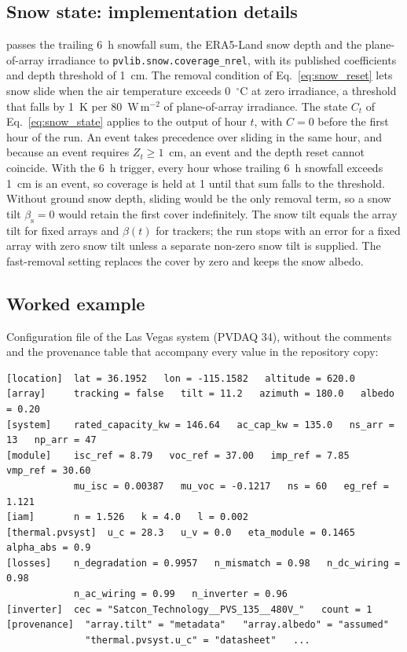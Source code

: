 \documentclass[11pt]{article}
\begin{document}
\subsection{Snow state: implementation details}
\label{sec:s_snow}

\RePV{} passes the trailing 6~h snowfall sum, the ERA5-Land snow depth and the plane-of-array irradiance to \texttt{pvlib.snow.coverage\_nrel}, with its published coefficients and depth threshold of 1~cm. The removal condition of Eq.~\ref{eq:snow_reset} lets snow slide when the air temperature exceeds 0~$^{\circ}$C at zero irradiance, a threshold that falls by 1~K per 80~W\,m$^{-2}$ of plane-of-array irradiance. The state $C_t$ of Eq.~\ref{eq:snow_state} applies to the output of hour $t$, with $C=0$ before the first hour of the run. An event takes precedence over sliding in the same hour, and because an event requires $Z_t\geq1$~cm, an event and the depth reset cannot coincide. With the 6~h trigger, every hour whose trailing 6~h snowfall exceeds 1~cm is an event, so coverage is held at 1 until that sum falls to the threshold. Without ground snow depth, sliding would be the only removal term, so a snow tilt $\beta_{\mathrm{s}}=0$ would retain the first cover indefinitely. The snow tilt equals the array tilt for fixed arrays and $\beta(t)$ for trackers; the run stops with an error for a fixed array with zero snow tilt unless a separate non-zero snow tilt is supplied. The fast-removal setting replaces the cover by zero and keeps the snow albedo.

\subsection{Worked example}
\label{sec:s_example}

Configuration file of the Las Vegas system (PVDAQ 34), without the comments and the provenance table that accompany every value in the repository copy:
{\scriptsize
\begin{verbatim}
[location]  lat = 36.1952   lon = -115.1582   altitude = 620.0
[array]     tracking = false   tilt = 11.2   azimuth = 180.0   albedo = 0.20
[system]    rated_capacity_kw = 146.64   ac_cap_kw = 135.0   ns_arr = 13   np_arr = 47
[module]    isc_ref = 8.79   voc_ref = 37.00   imp_ref = 7.85   vmp_ref = 30.60
            mu_isc = 0.00387   mu_voc = -0.1217   ns = 60   eg_ref = 1.121
[iam]       n = 1.526   k = 4.0   l = 0.002
[thermal.pvsyst]  u_c = 28.3   u_v = 0.0   eta_module = 0.1465   alpha_abs = 0.9
[losses]    n_degradation = 0.9957   n_mismatch = 0.98   n_dc_wiring = 0.98
            n_ac_wiring = 0.99   n_inverter = 0.96
[inverter]  cec = "Satcon_Technology__PVS_135__480V_"   count = 1
[provenance]  "array.tilt" = "metadata"   "array.albedo" = "assumed"
              "thermal.pvsyst.u_c" = "datasheet"   ...
\end{verbatim}}
\end{document}
